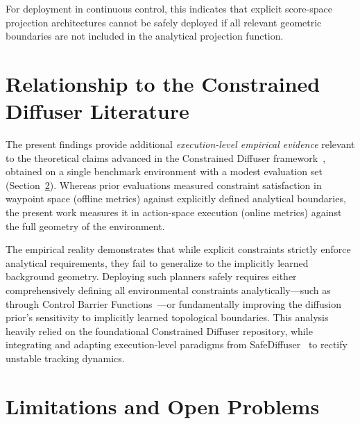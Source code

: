 \documentclass[12pt, a4paper, oneside]{report}
\theoremstyle{definition}
\begin{document}
For deployment in continuous control, this indicates that explicit score-space projection architectures cannot be safely deployed if all relevant geometric boundaries are not included in the analytical projection function.

\section{Relationship to the Constrained Diffuser Literature}

The present findings provide additional \emph{execution-level empirical evidence} relevant to the theoretical claims advanced in the Constrained Diffuser framework~\citep{zhang2026constrained}, obtained on a single benchmark environment with a modest evaluation set (Section~\ref{sec:limitations}). Whereas prior evaluations measured constraint satisfaction in waypoint space (offline metrics) against explicitly defined analytical boundaries, the present work measures it in action-space execution (online metrics) against the full geometry of the environment. 

The empirical reality demonstrates that while explicit constraints strictly enforce analytical requirements, they fail to generalize to the implicitly learned background geometry. Deploying such planners safely requires either comprehensively defining all environmental constraints analytically---such as through Control Barrier Functions~\citep{ames2019cbf}---or fundamentally improving the diffusion prior's sensitivity to implicitly learned topological boundaries. This analysis heavily relied on the foundational Constrained Diffuser repository, while integrating and adapting execution-level paradigms from SafeDiffuser~\citep{xiao2023safediffuser} to rectify unstable tracking dynamics.

\section{Limitations and Open Problems}
\label{sec:limitations}
\end{document}
